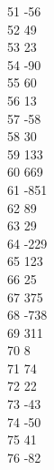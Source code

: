 { 51	-56 \\
 52	49 \\
 53	23 \\
 54	-90 \\
 55	60 \\
 56	13 \\
 57	-58 \\
 58	30 \\
 59	133 \\
 60	669 \\
 61	-851 \\
 62	89 \\
 63	29 \\
 64	-229 \\
 65	123 \\
 66	25 \\
 67	375 \\
 68	-738 \\
 69	311 \\
 70	8 \\
 71	74 \\
 72	22 \\
 73	-43 \\
 74	-50 \\
 75	41 \\
 76	-82 \\
}
